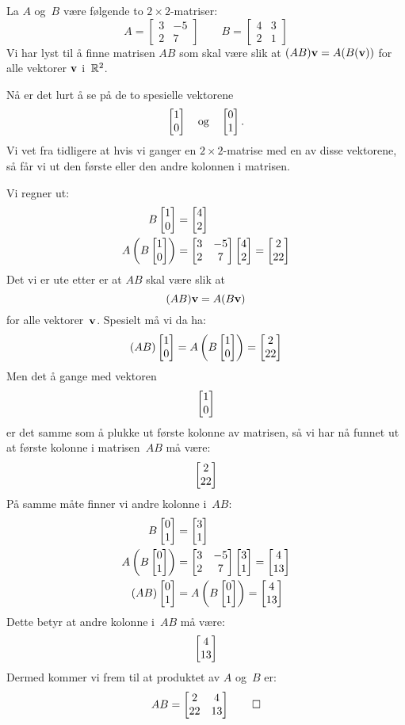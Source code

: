 \begin{ex}
La $A$ og~$B$ være følgende to $2 \times 2$-matriser:
\[
A =
\begin{bmatrix}
3 & -5 \\
2 &  7
\end{bmatrix}
\qquad
B =
\begin{bmatrix}
4 & 3 \\
2 & 1
\end{bmatrix}
\]
Vi har lyst til å finne matrisen $AB$ som skal være slik at
$(AB) \mathbf{v} = A(B(\mathbf{v}))$ for alle vektorer $\mathbf{v}$ i~$\mathbb{R}^2$.

Nå er det lurt å se på de to spesielle vektorene
\[
\begin{bmatrix} 1 \\ 0 \end{bmatrix}
\quad\text{og}\quad
\begin{bmatrix} 0 \\ 1 \end{bmatrix}.
\]
Vi vet fra tidligere at hvis vi ganger en $2 \times 2$-matrise med en
av disse vektorene, så får vi ut den første eller den andre kolonnen i
matrisen.

Vi regner ut:
\begin{align*}
B \begin{bmatrix} 1 \\ 0 \end{bmatrix} &= \begin{bmatrix} 4 \\ 2 \end{bmatrix} \\
A \left( B \begin{bmatrix} 1 \\ 0 \end{bmatrix} \right)
&=
\begin{bmatrix}
3 & -5 \\
2 &  7
\end{bmatrix}
\begin{bmatrix} 4 \\ 2 \end{bmatrix}
= \begin{bmatrix} 2 \\ 22 \end{bmatrix}
\end{align*}
Det vi er ute etter er at $AB$ skal være slik at
\[
(AB)\mathbf{v} = A(B\mathbf{v})
\]
for alle vektorer~$\mathbf{v}$.  Spesielt må vi da ha:
\[
(AB) \begin{bmatrix} 1 \\ 0 \end{bmatrix}
= A \left( B \begin{bmatrix} 1 \\ 0 \end{bmatrix} \right)
= \begin{bmatrix} 2 \\ 22 \end{bmatrix}
\]
Men det å gange med vektoren
\[
\begin{bmatrix} 1 \\ 0 \end{bmatrix}
\]
er det samme som å plukke ut første kolonne av matrisen, så vi har nå
funnet ut at første kolonne i matrisen~$AB$ må være:
\[
\begin{bmatrix} 2 \\ 22 \end{bmatrix}
\]
På samme måte finner vi andre kolonne i~$AB$:
\begin{align*}
B \begin{bmatrix} 0 \\ 1 \end{bmatrix} &= \begin{bmatrix} 3 \\ 1 \end{bmatrix}
\\
A \left( B \begin{bmatrix} 0 \\ 1 \end{bmatrix} \right)
&=
\begin{bmatrix}
3 & -5 \\
2 &  7
\end{bmatrix}
\begin{bmatrix} 3 \\ 1 \end{bmatrix}
= \begin{bmatrix} 4 \\ 13 \end{bmatrix}
\\
(AB) \begin{bmatrix} 0 \\ 1 \end{bmatrix} &= A \left( B \begin{bmatrix} 0 \\ 1 \end{bmatrix} \right) = \begin{bmatrix} 4 \\ 13 \end{bmatrix}
\end{align*}
Dette betyr at andre kolonne i~$AB$ må være:
\[
\begin{bmatrix} 4 \\ 13 \end{bmatrix}
\]
Dermed kommer vi frem til at produktet av $A$ og~$B$ er:
\[
AB =
\begin{bmatrix}
 2 &  4 \\
22 & 13
\end{bmatrix}
\qedhere
\]
%
%
%
%
\end{ex}

